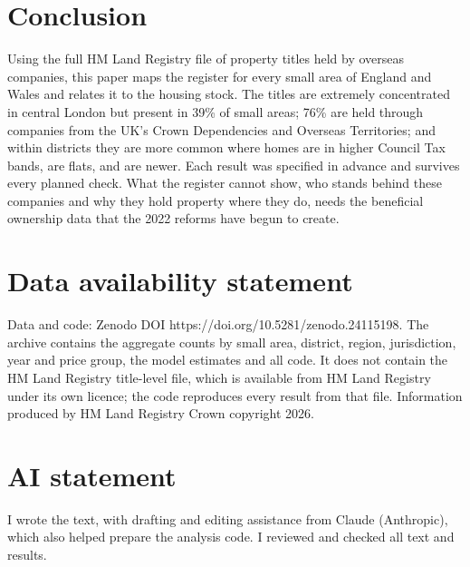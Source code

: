 \documentclass[11pt,a4paper]{article}
\begin{document}
\section{Conclusion}\label{sec:conc}
Using the full HM Land Registry file of property titles held by overseas companies, this paper maps the register for every small area of England and Wales and relates it to the housing stock. The titles are extremely concentrated in central London but present in 39\% of small areas; 76\% are held through companies from the UK's Crown Dependencies and Overseas Territories; and within districts they are more common where homes are in higher Council Tax bands, are flats, and are newer. Each result was specified in advance and survives every planned check. What the register cannot show, who stands behind these companies and why they hold property where they do, needs the beneficial ownership data that the 2022 reforms have begun to create.

\section*{Data availability statement}
Data and code: Zenodo DOI https://doi.org/10.5281/zenodo.24115198. The archive contains the aggregate counts by small area, district, region, jurisdiction, year and price group, the model estimates and all code. It does not contain the HM Land Registry title-level file, which is available from HM Land Registry under its own licence; the code reproduces every result from that file. Information produced by HM Land Registry \textcopyright{} Crown copyright 2026.

\section*{AI statement}
I wrote the text, with drafting and editing assistance from Claude (Anthropic), which also helped prepare the analysis code. I reviewed and checked all text and results.
\end{document}
